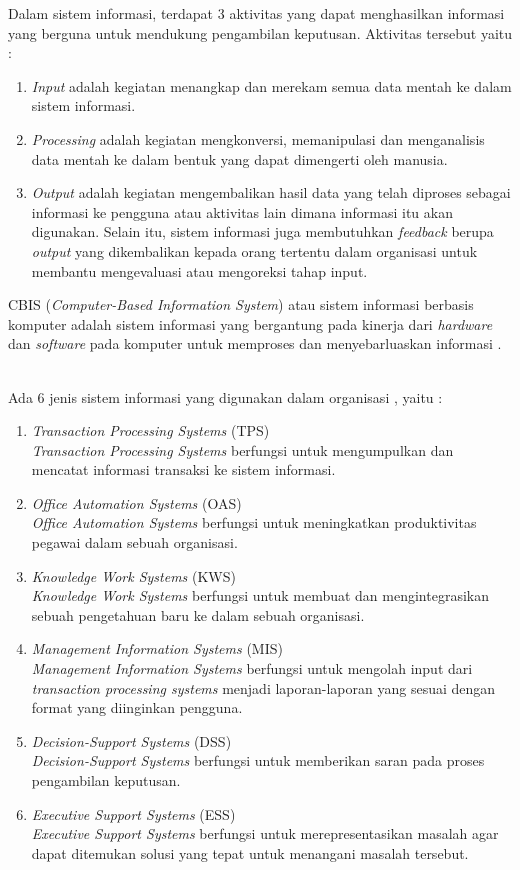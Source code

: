 Dalam sistem informasi, terdapat 3 aktivitas yang dapat menghasilkan informasi yang berguna untuk mendukung pengambilan keputusan. Aktivitas tersebut yaitu \cite{Laudon:1996} : 
\begin{enumerate}
	\item \textit{Input} adalah kegiatan menangkap dan merekam semua data mentah ke dalam sistem informasi.
	\item \textit{Processing} adalah kegiatan mengkonversi, memanipulasi dan menganalisis data mentah ke dalam bentuk yang dapat dimengerti oleh manusia.
	\item \textit{Output} adalah kegiatan mengembalikan hasil data yang telah diproses sebagai informasi ke pengguna atau aktivitas lain dimana informasi itu akan digunakan. Selain itu, sistem informasi juga membutuhkan \textit{feedback} berupa \textit{output} yang dikembalikan kepada orang tertentu dalam organisasi untuk membantu mengevaluasi atau mengoreksi tahap input.
\end{enumerate}

CBIS (\textit{Computer-Based Information System}) atau sistem informasi berbasis komputer adalah sistem informasi yang bergantung pada kinerja dari \textit{hardware} dan \textit{software} pada komputer untuk memproses dan menyebarluaskan informasi \cite{Laudon:1996}. \

Ada 6 jenis sistem informasi yang digunakan dalam organisasi \cite{Laudon:1996}, yaitu :
\begin{enumerate}
	\item \textit{Transaction Processing Systems} (TPS)\\
	\textit{Transaction Processing Systems} berfungsi untuk mengumpulkan dan mencatat informasi transaksi ke sistem informasi.
	\item \textit{Office Automation Systems} (OAS)\\
	\textit{Office Automation Systems} berfungsi untuk meningkatkan produktivitas pegawai dalam sebuah organisasi.
	\item \textit{Knowledge Work Systems} (KWS) \\
	\textit{Knowledge Work Systems} berfungsi untuk membuat dan mengintegrasikan sebuah pengetahuan baru ke dalam sebuah organisasi.
	\item \textit{Management Information Systems} (MIS) \\
	\textit{Management Information Systems} berfungsi untuk mengolah input dari \textit{transaction processing systems} menjadi laporan-laporan yang sesuai dengan format yang diinginkan pengguna.
	\item \textit{Decision-Support Systems} (DSS) \\
	\textit{Decision-Support Systems} berfungsi untuk memberikan saran pada proses pengambilan keputusan.
	\item \textit{Executive Support Systems} (ESS) \\
	\textit{Executive Support Systems} berfungsi untuk merepresentasikan masalah agar dapat ditemukan solusi yang tepat untuk menangani masalah tersebut.
\end{enumerate}

